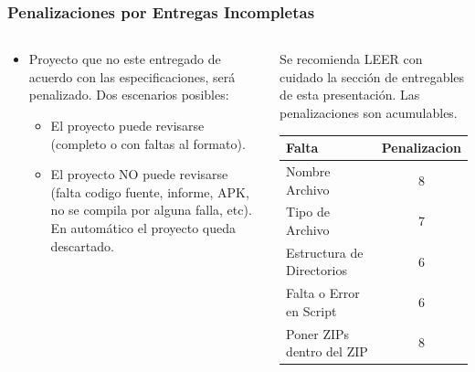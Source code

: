 \begin{frame}
\frametitle{Penalizaciones por Entregas Incompletas}
\begin{columns}
\begin{column}{0.5\textwidth}
\begin{itemize}
\item Proyecto que no este entregado de acuerdo con las especificaciones, ser\'a penalizado. Dos escenarios posibles:
\begin{itemize}
\item El proyecto puede revisarse (completo o con faltas al formato).
\item El proyecto NO puede revisarse (falta codigo fuente, informe, APK, no se compila por alguna falla, etc). En automático el proyecto queda descartado.
\end{itemize}
\end{itemize}
\end{column}
\begin{column}{0.5\textwidth}
Se recomienda LEER con cuidado la secci\'on de entregables de esta presentación. Las penalizaciones son acumulables. 
\begin{tabular}{p{3cm}|c}
\hline
\textbf{Falta} & \textbf{Penalizacion} \\
\hline
Nombre Archivo & 8 \\
Tipo de Archivo & 7 \\
Estructura de Directorios  & 6 \\
Falta o Error en Script  & 6 \\
Poner ZIPs dentro del ZIP  & 8 \\
\hline
\end{tabular}
\end{column}
\end{columns}
\end{frame}



